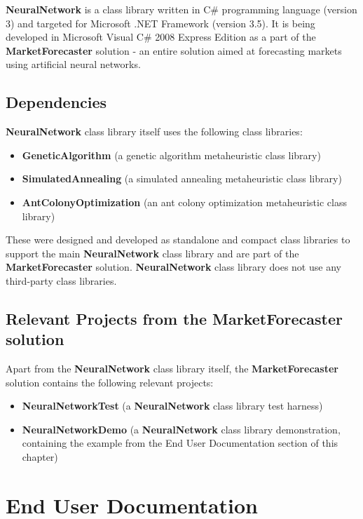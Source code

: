 \textbf{NeuralNetwork} is a class library written in C\# programming language (version 3) and targeted for Microsoft .NET Framework (version 3.5). It is being developed in Microsoft Visual C\# 2008 Express Edition as a part of the \textbf{MarketForecaster} solution - an entire solution aimed at forecasting markets using artificial neural networks.

\subsection{Dependencies}

\textbf{NeuralNetwork} class library itself uses the following class libraries:

\begin{itemize}
\item \textbf{GeneticAlgorithm} (a genetic algorithm metaheuristic class library)
\item \textbf{SimulatedAnnealing} (a simulated annealing metaheuristic class library)
\item \textbf{AntColonyOptimization} (an ant colony optimization metaheuristic class library)
\end{itemize}
These were designed and developed as standalone and compact class libraries to support the main \textbf{NeuralNetwork} class library and are part of the \textbf{MarketForecaster} solution. \textbf{NeuralNetwork} class library does not use any third-party class libraries.

\subsection{Relevant Projects from the \textbf{MarketForecaster} solution}

Apart from the \textbf{NeuralNetwork} class library itself, the \textbf{MarketForecaster} solution contains the following relevant projects:

\begin{itemize}
\item \textbf{NeuralNetworkTest} (a \textbf{NeuralNetwork} class library test harness)
\item \textbf{NeuralNetworkDemo} (a \textbf{NeuralNetwork} class library demonstration, containing the example from the End User Documentation section of this chapter)
\end{itemize}

\section{End User Documentation}

